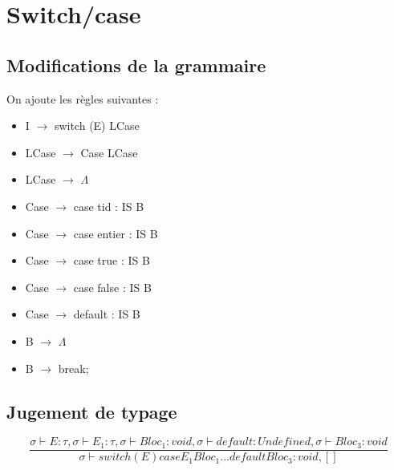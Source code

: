 \documentclass{article}
\begin{document}
\section{Switch/case}
\subsection{Modifications de la grammaire}
On ajoute les règles suivantes :
\begin{itemize}
    \item I $\rightarrow$ switch (E) {LCase}
    \item LCase $\rightarrow$ Case LCase
    \item LCase $\rightarrow$ $\Lambda$
    \item Case $\rightarrow$ case tid : IS B
    \item Case $\rightarrow$ case entier : IS B
    \item Case $\rightarrow$ case true : IS B
    \item Case $\rightarrow$ case false : IS B
    \item Case $\rightarrow$ default : IS B
    \item B $\rightarrow$ $\Lambda$
    \item B $\rightarrow$ break;
\end{itemize}
\subsection{Jugement de typage}
\begin{equation}
    \frac{\sigma \vdash E : \tau, \sigma \vdash E_1 : \tau, \sigma \vdash Bloc_1: void, \sigma \vdash default : Undefined, \sigma \vdash Bloc_3 : void}
        {\sigma \vdash switch (E) case E_1 Bloc_1 ... default Bloc_3 : void,[]}
\end{equation}
\end{document}
